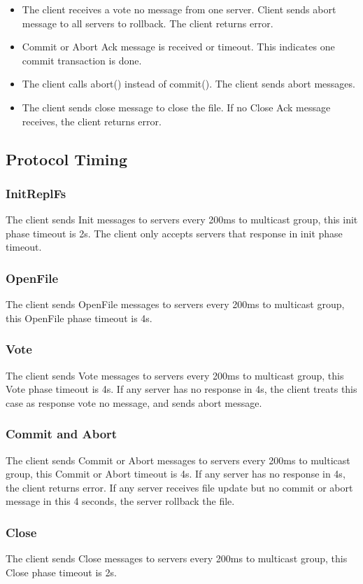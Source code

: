 \documentclass[12pt,fleqn]{article}
\begin{document}
\begin{itemize}
	\item The client receives a vote no message from one server. Client sends abort message to all servers to rollback. The client returns error.
	\item Commit or Abort Ack message is received or timeout. This indicates one commit transaction is done. 
	\item The client calls abort() instead of commit(). The client sends abort messages.	
	\item The client sends close message to close the file. If no Close Ack message receives, the client returns error. 
\end{itemize}

\subsection{Protocol Timing}
\subsubsection{InitReplFs}
The client sends Init messages to servers every 200ms to multicast group, this init phase timeout is 2s. The client only accepts servers that response in init phase timeout.

\subsubsection{OpenFile}
The client sends OpenFile messages to servers every 200ms to multicast group, this OpenFile phase timeout is 4s. 

\subsubsection{Vote}
The client sends Vote messages to servers every 200ms to multicast group, this Vote phase timeout is 4s. If any server has no response in 4s, the client treats this case as response vote no message, and sends abort message.

\subsubsection{Commit and Abort}
The client sends Commit or Abort messages to servers every 200ms to multicast group, this Commit or Abort timeout is 4s. If any server has no response in 4s, the client returns error. If any server receives file update but no commit or abort message in this 4 seconds, the server rollback the file. 
 
 \subsubsection{Close}
 The client sends Close messages to servers every 200ms to multicast group, this Close phase timeout is 2s. 
 
\end{document}
